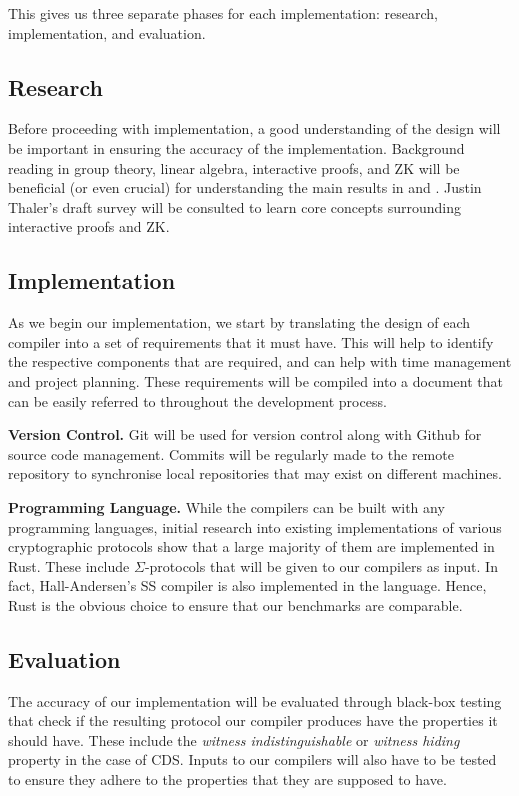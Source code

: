 \documentclass[a4paper,fleqn,12pt]{article}
\begin{document}
This gives us three separate phases for each implementation: research, implementation, and evaluation.

\subsection{Research}
Before proceeding with implementation, a good understanding of the design will be important in ensuring the accuracy of the implementation. Background reading in group theory, linear algebra, interactive proofs, and ZK will be beneficial (or even crucial) for understanding the main results in \cite{CDS94} and \cite{StackingSigmas}. Justin Thaler's draft survey \cite{PAZK} will be consulted to learn core concepts surrounding interactive proofs and ZK. 

\subsection{Implementation}
As we begin our implementation, we start by translating the design of each compiler into a set of requirements that it must have. This will help to identify the respective components that are required, and can help with time management and project planning. These requirements will be compiled into a document that can be easily referred to throughout the development process. 

\textbf{Version Control.} Git will be used for version control along with Github for source code management. Commits will be regularly made to the remote repository to synchronise local repositories that may exist on different machines. 

\textbf{Programming Language.} While the compilers can be built with any programming languages, initial research into existing implementations of various cryptographic protocols show that a large majority of them are implemented in Rust. These include $\Sigma$-protocols that will be given to our compilers as input. In fact, Hall-Andersen's SS compiler is also implemented in the language. Hence, Rust is the obvious choice to ensure that our benchmarks are comparable. 

\subsection{Evaluation}
The accuracy of our implementation will be evaluated through black-box testing that check if the resulting protocol our compiler produces have the properties it should have. These include the \textit{witness indistinguishable} or \textit{witness hiding} property in the case of CDS. Inputs to our compilers will also have to be tested to ensure they adhere to the properties that they are supposed to have. 
\end{document}

